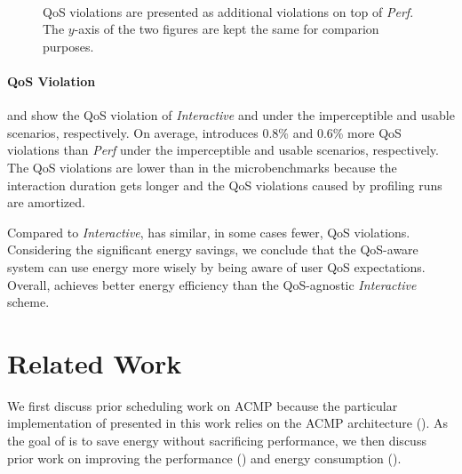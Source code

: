 \begin{figure}[p]
\centering
{}\\
\vspace*{25pt}
\caption{QoS violations are presented as additional violations on top of \textit{Perf}. The $y$-axis of the two figures are kept the same for comparion purposes.}
\label{fig:full_results}
\end{figure}

\paragraph{QoS Violation}  and  show the QoS violation of \textit{Interactive} and \ebs under the imperceptible and usable scenarios, respectively. On average, \ebs introduces 0.8\% and 0.6\% more QoS violations than \textit{Perf} under the imperceptible and usable scenarios, respectively. The QoS violations are lower than in the microbenchmarks because the interaction duration gets longer and the QoS violations caused by profiling runs are amortized.

Compared to \textit{Interactive}, \ebs has similar, in some cases fewer, QoS violations. Considering the significant energy savings, we conclude that the QoS-aware \ebs system can use energy more wisely by being aware of user QoS expectations. Overall, \ebs achieves better energy efficiency than the QoS-agnostic \textit{Interactive} scheme.

\section{Related Work}
\label{sec:runtime:related}

We first discuss prior scheduling work on ACMP because the particular implementation of \webrt presented in this work relies on the ACMP architecture (). As the goal of \webrt is to save energy without sacrificing performance, we then discuss prior work on improving the performance () and energy consumption ().

